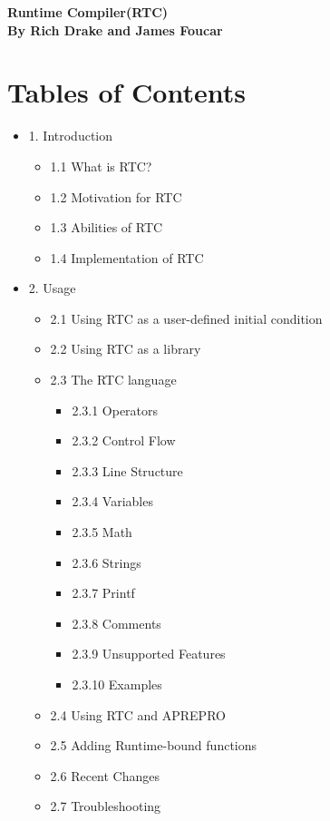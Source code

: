 \documentclass{article}
\begin{document}
\thispagestyle{empty}
\begin{center}
  \large\bf Runtime Compiler(RTC) \\ 
  \large\bf By Rich Drake and James Foucar \\
  \bigskip
\end{center}


\section*{Tables of Contents}
\begin{itemize}
  \item 1. Introduction
    \begin{itemize}
      \item 1.1 What is RTC?
      \item 1.2 Motivation for RTC
      \item 1.3 Abilities of RTC
      \item 1.4 Implementation of RTC
    \end{itemize}
  \item 2. Usage
    \begin{itemize}
      \item 2.1 Using RTC as a user-defined initial condition
      \item 2.2 Using RTC as a library
      \item 2.3 The RTC language
        \begin{itemize}
          \item 2.3.1 Operators
          \item 2.3.2 Control Flow
          \item 2.3.3 Line Structure
          \item 2.3.4 Variables
          \item 2.3.5 Math
          \item 2.3.6 Strings
          \item 2.3.7 Printf
          \item 2.3.8 Comments
          \item 2.3.9 Unsupported Features
          \item 2.3.10 Examples
        \end{itemize}
      \item 2.4 Using RTC and APREPRO
      \item 2.5 Adding Runtime-bound functions
      \item 2.6 Recent Changes
      \item 2.7 Troubleshooting 
    \end{itemize}
\end{itemize}
\end{document}
